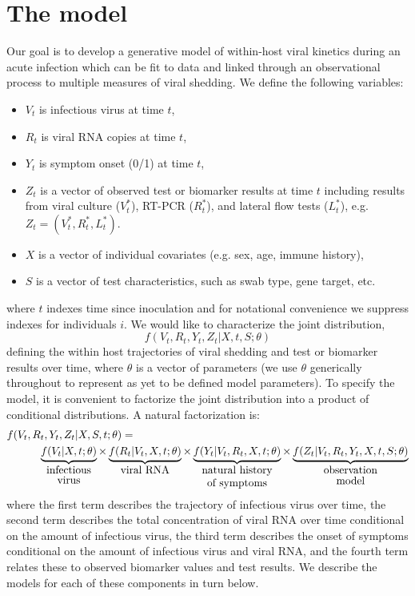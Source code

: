 \documentclass[11pt]{article}
\begin{document}
\section{The model} \label{sec:model}
Our goal is to develop a generative model of within-host viral kinetics during an acute infection which can be fit to data and linked through an observational process to multiple measures of viral shedding. We define the following variables:
\begin{itemize}
    \item $V_t$ is infectious virus at time $t$,
    \item $R_t$ is viral RNA copies at time $t$,
    \item $Y_t$ is symptom onset (0/1) at time $t$,
    \item $Z_t$ is a vector of observed test or biomarker results at time $t$ including results from viral culture ($V^*_t$), RT-PCR ($R^*_t$), and lateral flow tests ($L^*_t$), e.g. $Z_t = (V^*_t, R^*_t, L^*_t)$.
    \item $X$ is a vector of individual covariates (e.g. sex, age, immune history),
    \item $S$ is a vector of test characteristics, such as swab type, gene target, etc.
\end{itemize}
where $t$ indexes time since inoculation and for notational convenience we suppress indexes for individuals $i$. We would like to characterize the joint distribution, 
$$
f(V_t, R_t, Y_t, Z_t | X, t, S; \theta)
$$
defining the within host trajectories of viral shedding and test or biomarker results over time, where $\theta$ is a vector of parameters (we use $\theta$ generically throughout to represent as yet to be defined model parameters). To specify the model, it is convenient to factorize the joint distribution into a product of conditional distributions. A natural factorization is:
\begin{align*}
    f(&V_t, R_t, Y_t, Z_t | X, S, t; \theta) = \\ & \qquad \underbrace{f(V_t | X, t; \theta)}_{\shortstack{infectious \\ virus}} \times \underbrace{f(R_t | V_t, X, t; \theta)}_{\shortstack{viral RNA}} \times \underbrace{f(Y_t | V_t, R_t, X, t; \theta)}_{\shortstack{natural history \\ of symptoms}} \times \underbrace{f(Z_t | V_t, R_t, Y_t, X, t, S; \theta)}_{\shortstack{observation \\ model}}
\end{align*}
where the first term describes the trajectory of infectious virus over time, the second term describes the total concentration of viral RNA over time conditional on the amount of infectious virus, the third term describes the onset of symptoms conditional on the amount of infectious virus and viral RNA, and the fourth term relates these to observed biomarker values and test results. We describe the models for each of these components in turn below.
\end{document}
